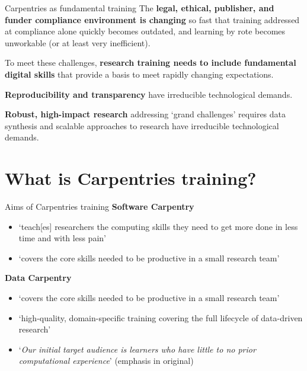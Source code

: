 \documentclass[aspectratio=169, 11pt]{beamer} %
\begin{document}
\begin{frame}{Carpentries as fundamental training}
     The \textbf{legal, ethical, publisher, and funder compliance environment is changing} so fast that training addressed at compliance alone quickly becomes outdated, and learning by rote becomes unworkable (or at least very inefficient). \par
     To meet these challenges, \textbf{research training needs to include fundamental digital skills} that provide a basis to meet rapidly changing expectations. \par
     \textbf{Reproducibility and transparency} have irreducible technological demands. \par
     \textbf{Robust, high-impact research} addressing `grand challenges'  requires data synthesis and scalable approaches to research have  irreducible technological demands.
\end{frame}


\section{What is Carpentries training?}

\begin{frame}{Aims of Carpentries training}
  \textbf{Software Carpentry} \cite{The_Carpentries2019-ej}
  \begin{itemize}[label=\textbullet]
    \item `teach[es] researchers the computing skills they need to get more done in less time and with less pain'
    \item `covers the core skills needed to be productive in a small research team'
  \end{itemize}
  \textbf{Data Carpentry} \cite{The_Carpentries2019-aa}
  \begin{itemize}
    \item `covers the core skills needed to be productive in a small research team'
    \item `high-quality, domain-specific training covering the full lifecycle of data-driven research'
    \item `\textit{Our initial target audience is learners who have little to no prior computational experience}' (emphasis in original)
  \end{itemize}
\end{frame}
\end{document}
